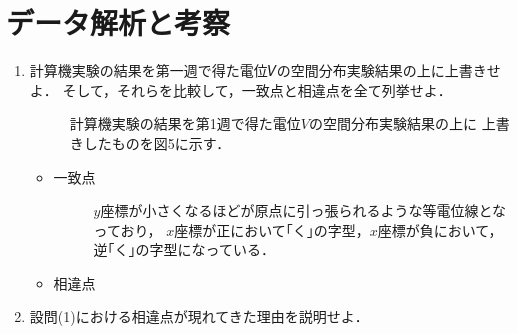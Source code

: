 
\section{データ解析と考察}

\begin{enumerate}
    \item 計算機実験の結果を第一週で得た電位𝑉の空間分布実験結果の上に上書きせよ．
    そして，それらを比較して，一致点と相違点を全て列挙せよ．
    \begin{description}
        \item[] 計算機実験の結果を第1週で得た電位$V$の空間分布実験結果の上に
        上書きしたものを図5に示す．
    \end{description}
    
    \begin{itemize}
        \item 一致点
        \begin{description}
            \item[] $y$座標が小さくなるほどが原点に引っ張られるような等電位線となっており，
            $x$座標が正において｢く｣の字型，$x$座標が負において，逆｢く｣の字型になっている．
        \end{description}

        \item 相違点
        \begin{description}
            \item[] 
        \end{description}
    \end{itemize}

    \item 設問(1)における相違点が現れてきた理由を説明せよ．
    \begin{description}
        \item[] 
    \end{description}
\end{enumerate}